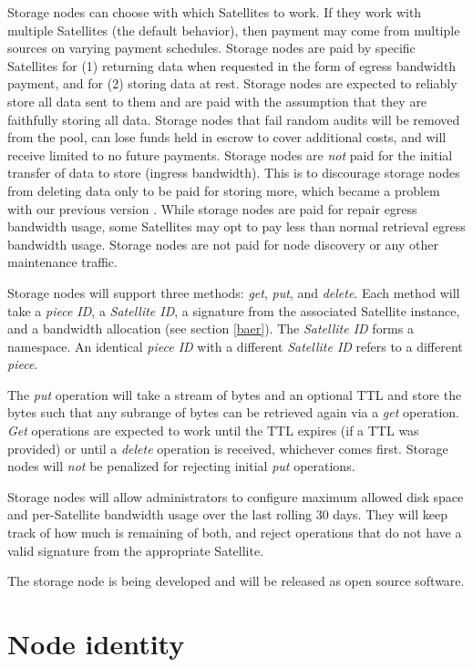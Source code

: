 \documentclass[8pt,fleqn,openany]{book}
\newcommand{\code}[1]{{\em #1}}
\begin{document}
Storage nodes can choose with which Satellites to work. If they work
with multiple Satellites (the default behavior), then payment may come from
multiple sources on varying payment schedules.
Storage nodes are paid by specific Satellites for (1) returning data when
requested in
the form of egress bandwidth payment, and for (2) storing data at rest.
Storage nodes are expected to reliably store all data sent to them and are
paid with the assumption that they are faithfully storing all data.
Storage nodes that fail random audits will be removed from the pool, can lose
funds held in escrow to cover additional costs, and will
receive
limited to no future payments.
Storage nodes are {\em not} paid for the initial transfer of data to store
(ingress bandwidth).
This is to discourage storage nodes from deleting data only to be paid for
storing more, which became a problem with our previous version \cite{storj-v2}.
While storage nodes are paid for repair egress bandwidth usage,
some Satellites may opt to pay less than normal retrieval egress bandwidth
usage.
Storage nodes are not paid for node discovery or any other maintenance traffic.

Storage nodes will support three methods: \code{get}, \code{put}, and
\code{delete}.
Each method will take a {\em piece ID}, a {\em Satellite ID}, a signature
from the associated Satellite instance, and a bandwidth allocation (see
section \ref{baer}).
The {\em Satellite ID} forms a namespace. An identical {\em piece ID} with a
different {\em Satellite ID} refers to a different {\em piece}.

The \code{put} operation will take a stream of bytes and an optional TTL and
store the bytes such
that any subrange of bytes can be retrieved again via a \code{get} operation.
\code{Get} operations are expected to work until the TTL expires (if a TTL was
provided) or until a \code{delete} operation is received, whichever comes
first.
Storage nodes will {\em not} be penalized for rejecting initial \code{put}
operations.

Storage nodes will allow administrators to configure maximum allowed disk
space and per-Satellite bandwidth usage over the last rolling 30 days.
They will keep track of how much is remaining of both, and reject operations
that do not have a valid signature from the appropriate Satellite.

The storage node is being developed and will be released as open source software.

\section{Node identity}\label{sec:node-id}
\end{document}
